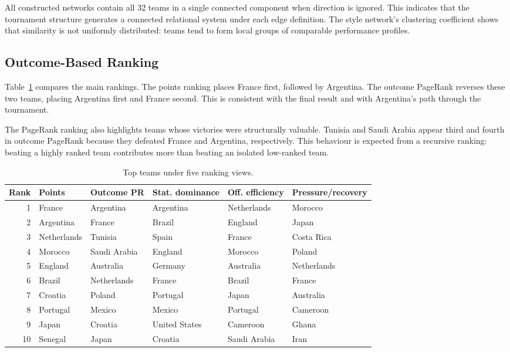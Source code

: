 \documentclass[10pt,twocolumn]{article}
\begin{document}
All constructed networks contain all 32 teams in a single connected component when direction is ignored. This indicates that the tournament structure generates a connected relational system under each edge definition. The style network's clustering coefficient shows that similarity is not uniformly distributed: teams tend to form local groups of comparable performance profiles.

\subsection{Outcome-Based Ranking}

Table~\ref{tab:rankings} compares the main rankings. The points ranking places France first, followed by Argentina. The outcome PageRank reverses these two teams, placing Argentina first and France second. This is consistent with the final result and with Argentina's path through the tournament.

The PageRank ranking also highlights teams whose victories were structurally valuable. Tunisia and Saudi Arabia appear third and fourth in outcome PageRank because they defeated France and Argentina, respectively. This behaviour is expected from a recursive ranking: beating a highly ranked team contributes more than beating an isolated low-ranked team.

\begin{table}[t]
\centering
\caption{Top teams under five ranking views.}
\label{tab:rankings}
\small
\begin{tabular}{rlllll}
\toprule
Rank & Points & Outcome PR & Stat. dominance & Off. efficiency & Pressure/recovery \\
\midrule
1 & France & Argentina & Argentina & Netherlands & Morocco \\
2 & Argentina & France & Brazil & England & Japan \\
3 & Netherlands & Tunisia & Spain & France & Costa Rica \\
4 & Morocco & Saudi Arabia & England & Morocco & Poland \\
5 & England & Australia & Germany & Australia & Netherlands \\
6 & Brazil & Netherlands & France & Brazil & France \\
7 & Croatia & Poland & Portugal & Japan & Australia \\
8 & Portugal & Mexico & Mexico & Portugal & Cameroon \\
9 & Japan & Croatia & United States & Cameroon & Ghana \\
10 & Senegal & Japan & Croatia & Saudi Arabia & Iran \\
\bottomrule
\end{tabular}
\end{table}
\end{document}
